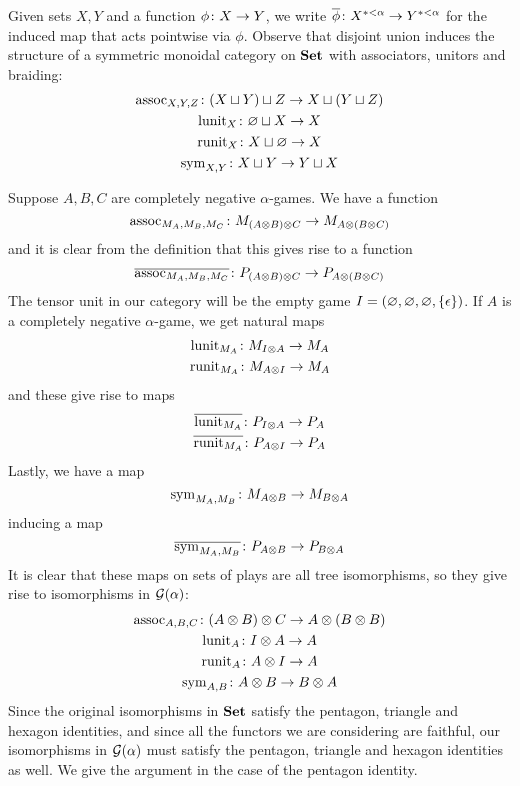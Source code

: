 \documentclass[11pt]{article} %
\begin{document}
Given sets $X,Y$ and a function $\phi\colon{}X\to{}Y$, we write $\overline\phi\colon X^{*<\alpha}\to Y^{*<\alpha}$ for the induced map that acts pointwise via $\phi$.  Observe that disjoint union induces the structure of a symmetric monoidal category on ${\normalfont\textbf{Set}}$ with associators, unitors and braiding:
\begin{gather*}
  \operatorname{assoc}_{X,Y,Z}\colon (X\sqcup Y)\sqcup Z\to X\sqcup(Y\sqcup Z)\\
  \operatorname{lunit}_X\colon \varnothing\sqcup X\to X\\
  \operatorname{runit}_X\colon X\sqcup\varnothing\to X\\
  \operatorname{sym}_{X,Y}\colon X\sqcup Y\to Y\sqcup X
\end{gather*}

Suppose $A,B,C$ are completely negative $\alpha$-games.  We have a function
\[
  \operatorname{assoc}_{M_A,M_B,M_C}\colon M_{(A\otimes B)\otimes C}\to M_{A\otimes(B\otimes C)}
  \]
and it is clear from the definition that this gives rise to a function
\[
  \overline{\operatorname{assoc}_{M_A,M_B,M_C}}\colon P_{(A\otimes B)\otimes C}\to P_{A\otimes(B\otimes C)}
  \]
The tensor unit in our category will be the empty game $I=(\varnothing, \varnothing, \varnothing, \{\epsilon\})$.  If $A$ is a completely negative $\alpha$-game, we get natural maps
\begin{gather*}
  \operatorname{lunit}_{M_A}\colon M_{I\otimes A}\to M_A \\
  \operatorname{runit}_{M_A}\colon M_{A\otimes I}\to M_A
\end{gather*}
and these give rise to maps
\begin{gather*}
  \overline{\operatorname{lunit}_{M_A}}\colon P_{I\otimes A}\to P_A\\
  \overline{\operatorname{runit}_{M_A}}\colon P_{A\otimes I}\to P_A
\end{gather*}
Lastly, we have a map
\[
  \operatorname{sym}_{M_A,M_B}\colon M_{A\otimes B}\to M_{B\otimes A}
  \]
inducing a map
\[
  \overline{\operatorname{sym}_{M_A,M_B}}\colon P_{A\otimes B}\to P_{B\otimes A}
  \]
It is clear that these maps on sets of plays are all tree isomorphisms, so they give rise to isomorphisms in $\mathcal G(\alpha)$:
\begin{gather*}
  \operatorname{assoc}_{A,B,C}\colon (A\otimes B)\otimes C\to A\otimes (B\otimes B)\\
  \operatorname{lunit}_A\colon I\otimes A\to A\\
  \operatorname{runit}_A\colon A\otimes I\to A\\
  \operatorname{sym}_{A,B}\colon A\otimes B\to B\otimes A
\end{gather*}
Since the original isomorphisms in ${\normalfont\textbf{Set}}$ satisfy the pentagon, triangle and hexagon identities, and since all the functors we are considering are faithful, our isomorphisms in $\mathcal G(\alpha)$ must satisfy the pentagon, triangle and hexagon identities as well.  We give the argument in the case of the pentagon identity.  
\end{document}
